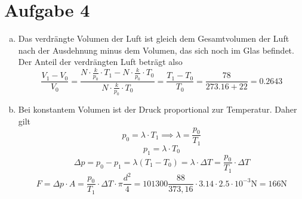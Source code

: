 \documentclass{article}
\begin{document}
    \section*{Aufgabe 4}
    \begin{enumerate}[(a)]
        \item Das verdrängte Volumen der Luft ist gleich dem Gesamtvolumen der Luft nach der Ausdehnung minus dem Volumen, das sich noch im Glas befindet. Der Anteil der verdrängten Luft beträgt also $$\frac{V_1-V_0}{V_0} = \frac{N\cdot \frac{k}{p_0} \cdot T_1 - N\cdot \frac{k}{p_0} \cdot T_0}{N\cdot \frac{k}{p_0} \cdot T_0} = \frac{T_1-T_0}{T_0} = \frac{78}{273.16 + 22} = 0.2643$$
        \item Bei konstantem Volumen ist der Druck proportional zur Temperatur. Daher gilt $$p_0 = \lambda \cdot T_1 \implies \lambda = \frac{p_0}{T_1}$$
        $$p_1 = \lambda \cdot T_0$$
        $$\Delta p = p_0 - p_1 = \lambda ( T_1 - T_0) = \lambda \cdot \Delta T = \frac{p_0}{T_1} \cdot \Delta T$$
        $$F = \Delta p \cdot A = \frac{p_0}{T_1} \cdot \Delta T \cdot \pi \frac{d^2}{4} = 101300 \frac{88}{373,16} \cdot 3.14 \cdot 2.5 \cdot 10^{-3} \mathrm{N} = 166 \mathrm{N}$$
    \end{enumerate}
\end{document}
